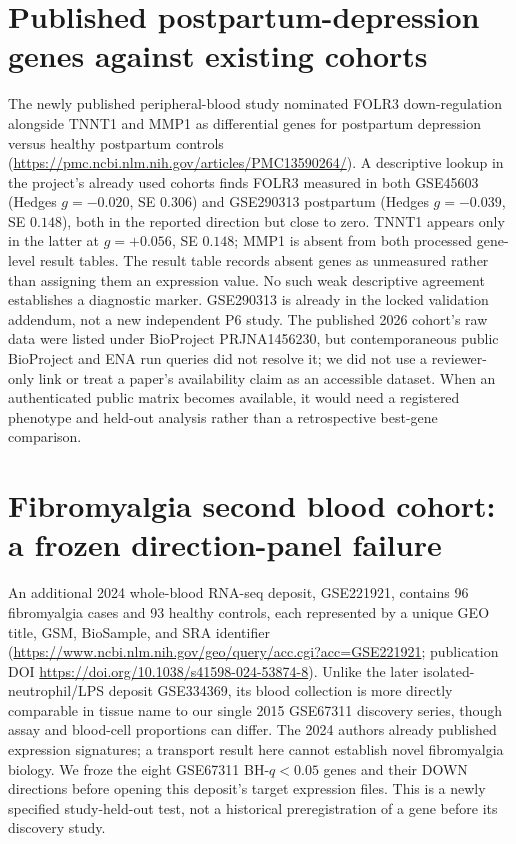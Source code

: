\documentclass[11pt,a4paper]{article}
\begin{document}
\section{Published postpartum-depression genes against existing cohorts}
The newly published peripheral-blood study nominated FOLR3 down-regulation alongside TNNT1 and MMP1 as differential genes for postpartum depression versus healthy postpartum controls (\url{https://pmc.ncbi.nlm.nih.gov/articles/PMC13590264/}). A descriptive lookup in the project's already used cohorts finds FOLR3 measured in both GSE45603 (Hedges $g=-0.020$, SE $0.306$) and GSE290313 postpartum (Hedges $g=-0.039$, SE $0.148$), both in the reported direction but close to zero. TNNT1 appears only in the latter at $g=+0.056$, SE $0.148$; MMP1 is absent from both processed gene-level result tables. The result table records absent genes as unmeasured rather than assigning them an expression value. No such weak descriptive agreement establishes a diagnostic marker. GSE290313 is already in the locked validation addendum, not a new independent P6 study. The published 2026 cohort's raw data were listed under BioProject PRJNA1456230, but contemporaneous public BioProject and ENA run queries did not resolve it; we did not use a reviewer-only link or treat a paper's availability claim as an accessible dataset. When an authenticated public matrix becomes available, it would need a registered phenotype and held-out analysis rather than a retrospective best-gene comparison.

\section{Fibromyalgia second blood cohort: a frozen direction-panel failure}
An additional 2024 whole-blood RNA-seq deposit, GSE221921, contains 96 fibromyalgia cases and 93 healthy controls, each represented by a unique GEO title, GSM, BioSample, and SRA identifier (\url{https://www.ncbi.nlm.nih.gov/geo/query/acc.cgi?acc=GSE221921}; publication DOI \url{https://doi.org/10.1038/s41598-024-53874-8}). Unlike the later isolated-neutrophil/LPS deposit GSE334369, its blood collection is more directly comparable in tissue name to our single 2015 GSE67311 discovery series, though assay and blood-cell proportions can differ. The 2024 authors already published expression signatures; a transport result here cannot establish novel fibromyalgia biology. We froze the eight GSE67311 BH-$q<0.05$ genes and their DOWN directions before opening this deposit's target expression files. This is a newly specified study-held-out test, not a historical preregistration of a gene before its discovery study.
\end{document}
